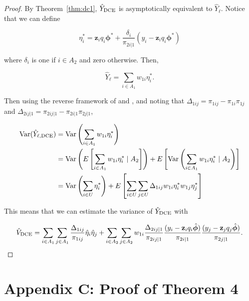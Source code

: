 \documentclass[12pt]{article}
\newcommand{\Var}{{\text{Var}}}
\renewcommand{\bf}[1]{\mathbf{#1}}
\begin{document}
\begin{proof}
  By Theorem~\ref{thm:dc1}, $\hat Y_{\rm DCE}$ is asymptotically equivalent to
  $\hat Y_{\ell}$. Notice that we can define

  $$
  \eta_i^* = 
  \bf z_i q_i \bm \phi^* + \frac{\delta_i}{\pi_{2i|1}}(y_i - \bf z_i q_i \bm \phi^*)
  $$

  where $\delta_i$ is one if $i \in A_2$ and zero otherwise. Then,

  $$
  \hat Y_{\ell} = \sum_{i \in A_1} w_{1i} \eta_i^*.
  $$

  Then using the reverse framework of \cite{fay1992inferences} and 
  \cite{shao1999variance}, and noting that 
  $\Delta_{1ij} = \pi_{1ij} - \pi_{1i}\pi_{1j}$ and 
  $\Delta_{2ij|1} = \pi_{2ij|1} - \pi_{2i|1}\pi_{2j|1}$,

  \begin{align*}
    \Var(\hat Y_{\ell, \rm{DCE}}) 
    &= \Var\left(\sum_{i \in A_1} w_{1i} \eta_i^*\right) \\
    &= \Var\left(E\left[\sum_{i \in A_1} w_{1i} \eta_i^* \mid A_2 \right]\right) 
    + E\left[\Var\left(\sum_{i \in A_1} w_{1i} \eta_i^* \mid A_2 \right)\right] \\
    &= \Var\left(\sum_{i \in U} \eta_i^*\right) 
    + E\left[\sum_{i \in U} \sum_{j \in U} \Delta_{1ij} w_{1i} \eta_i^* w_{1j}
      \eta_j^*\right]\\
  \end{align*}

  This means that we can estimate the variance of $\hat Y_{\rm DCE}$ with

  $$
  \hat V_{\rm DCE} 
  = \sum_{i \in A_1} \sum_{j \in A_1} \frac{\Delta_{1ij}}{\pi_{1ij}} 
  \hat \eta_i \hat \eta_j
  + \sum_{i \in A_2} \sum_{j \in A_2} w_{1i} \frac{\Delta_{2ij|1}}{\pi_{2ij|1}} 
  \frac{(y_i - \bf z_i q_i \hat{\bm \phi})}{\pi_{2i|1}}
  \frac{(y_j - \bf z_j q_j \hat{\bm \phi})}{\pi_{2j|1}}.
  $$

\end{proof}

\section*{Appendix C: Proof of Theorem 4}
\end{document}
